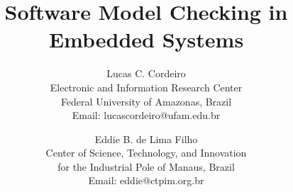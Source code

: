 \documentclass{acm_sen_article}
\begin{document}
%
\title{Software Model Checking in Embedded Systems}


\author{Lucas C. Cordeiro \\
Electronic and Information Research Center\\
Federal University of Amazonas, Brazil\\
Email: lucascordeiro@ufam.edu.br
\and
Eddie B. de Lima Filho \\
Center of Science, Technology, and Innovation \\ for the Industrial Pole of Manaus, Brazil \\
Email: eddie@ctpim.org.br}


% 
\end{document}
